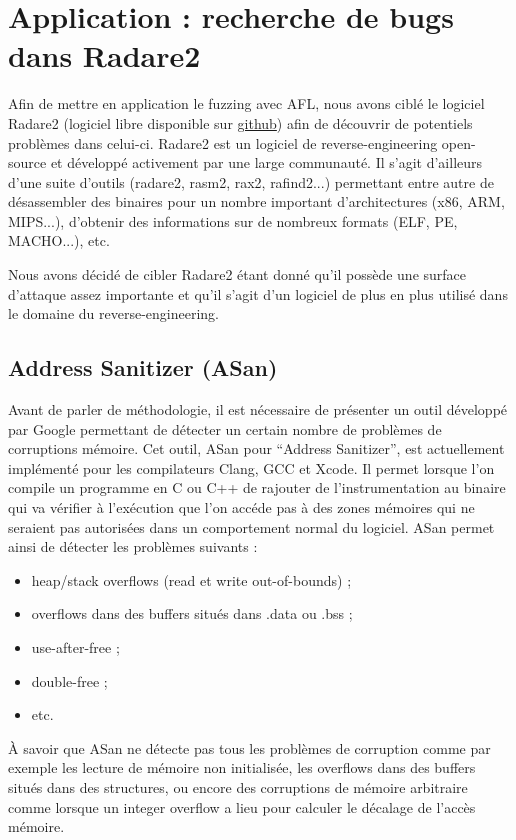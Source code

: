 \chapter{Application : recherche de bugs dans Radare2}

Afin de mettre en application le fuzzing avec AFL, nous avons ciblé le logiciel Radare2 (logiciel libre disponible sur \href{https://github.com/radare/radare2}{github}) afin de découvrir de potentiels problèmes dans celui-ci.
Radare2 est un logiciel de reverse-engineering open-source et développé activement par une large communauté.
Il s'agit d'ailleurs d'une suite d'outils (radare2, rasm2, rax2, rafind2...) permettant entre autre de désassembler des binaires pour un nombre important d'architectures (x86, ARM, MIPS...), d'obtenir des informations sur de nombreux formats (ELF, PE, MACHO...), etc.

Nous avons décidé de cibler Radare2 étant donné qu'il possède une surface d'attaque assez importante et qu'il s'agit d'un logiciel de plus en plus utilisé dans le domaine du reverse-engineering.

\section{Address Sanitizer (ASan)}

Avant de parler de méthodologie, il est nécessaire de présenter un outil développé par Google permettant de détecter un certain nombre de problèmes de corruptions mémoire.
Cet outil, ASan pour ``Address Sanitizer'', est actuellement implémenté pour les compilateurs Clang, GCC et Xcode.
Il permet lorsque l'on compile un programme en C ou C++ de rajouter de l'instrumentation au binaire qui va vérifier à l'exécution que l'on accéde pas à des zones mémoires qui ne seraient pas autorisées dans un comportement normal du logiciel.
ASan permet ainsi de détecter les problèmes suivants :

\begin{itemize}
\item heap/stack overflows (read et write out-of-bounds) ;
\item overflows dans des buffers situés dans .data ou .bss ;
\item use-after-free ;
\item double-free ;
\item etc.
\end{itemize}

À savoir que ASan ne détecte pas tous les problèmes de corruption comme par exemple les lecture de mémoire non initialisée, les overflows dans des buffers situés dans des structures, ou encore des corruptions de mémoire arbitraire comme lorsque un integer overflow a lieu pour calculer le décalage de l'accès mémoire.

